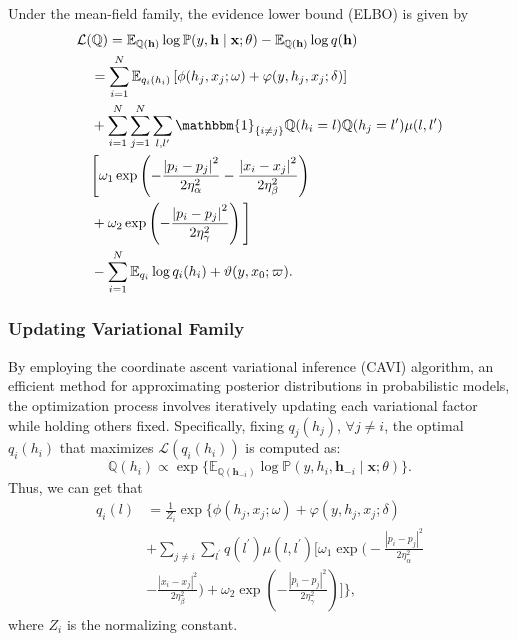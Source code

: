 \documentclass[conference]{IEEEtran}
\newcommand{\EE}{{\mathbb{E}}}
\newcommand{\hb}{\mathbf{h}}
\newcommand{\Lc}{\mathcal{L}}
\newcommand{\PP}{{\mathbb{P}}}
\newcommand{\QQ}{{\mathbb{Q}}}
\newcommand{\xb}{\mathbf{x}}
\newcommand{\one}{\mathbbm{1}}
\let\oldsubsubsection\subsubsection
\renewcommand{\subsubsection}[1]{\oldsubsubsection{\textbf{#1}}}
\begin{document}
Under the mean-field family, the evidence lower bound (ELBO) is given by
\begin{equation}
\begin{split}
& \Lc(\QQ) = \EE_{\QQ(\hb)} \log\PP(y, \hb \mid \xb; \theta)
- \EE_{\QQ(\hb)} \log q(\hb) \\
&\quad = \sum_{i=1}^N \EE_{q_i(h_i)}
\left[ \phi(h_j, x_j; \omega) + \varphi(y, h_j, x_j; \delta) \right] \\
&\quad + \sum_{i=1}^N \sum_{j=1}^N \sum_{l,l^\prime} \one_{\{i \neq j\}} 
\QQ(h_i = l) \QQ(h_j = l^\prime) \mu(l, l^\prime) \\
&\quad \Bigg[ \omega_1 \exp \left(
- \frac{\left\lvert p_i - p_j \right\rvert^2}{2\eta_\alpha^2}
- \frac{\left\lvert x_i - x_j \right\rvert^2}{2\eta_\beta^2} \right) \\
&\quad + \omega_2 \exp \left(
- \frac{\left\lvert p_i - p_j \right\rvert^2}{2\eta_\gamma^2}
\right) \Bigg] \\
&\quad - \sum_{i=1}^N \EE_{q_i} \log q_i(h_i) + \vartheta(y, x_0; \varpi).
\end{split}
\end{equation}


\subsubsection{Updating Variational Family}


By employing the coordinate ascent variational inference (CAVI) algorithm,
an efficient method for approximating posterior distributions in probabilistic
models, the optimization process involves iteratively updating each variational
factor while holding others fixed. Specifically, fixing $q_j(h_j)$,
$\forall j \neq i$, the optimal $q_i(h_i)$ that maximizes $\Lc(q_i(h_i))$
is computed as:
\begin{equation*}
\QQ(h_i) \propto \exp\{\EE_{\QQ(\hb_{-i})}
\log\PP(y, h_i, \hb_{-i} \mid \xb; \theta)\}.
\end{equation*}
Thus, we can get that
\begin{equation*}
\begin{split}
q_i(l) &= \frac{1}{Z_i} \exp \Bigg\{
\phi(h_j, x_j; \omega) + \varphi(y, h_j, x_j; \delta) \\
&+ \sum_{j \neq i} \sum_{l^\prime} q(l^\prime) \mu(l, l^\prime) 
\Bigg[ \omega_1 \exp \bigg(
- \frac{\left\lvert p_i - p_j \right\rvert^2}{2\eta_\alpha^2}\\
&- \frac{\left\lvert x_i - x_j \right\rvert^2}{2\eta_\beta^2}
\bigg)
+ \omega_2 \exp \left(
- \frac{\left\lvert p_i - p_j 
\right\rvert^2}{2\eta_\gamma^2}
\right)
\Bigg]
\Bigg\},
\end{split}
\end{equation*}
where $Z_i$ is the normalizing constant.
\end{document}
